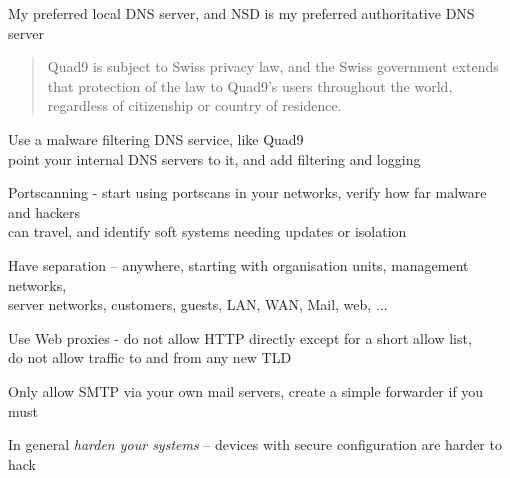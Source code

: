 \documentclass[Screen16to9,17pt]{foils}
\begin{document}

My preferred local DNS server, and NSD is my preferred authoritative DNS server


\begin{quote}
Quad9 is subject to Swiss privacy law, and the Swiss government extends that protection of the law to Quad9's users throughout the world, regardless of citizenship or country of residence.
\end{quote}

\begin{list2}
\item Use a malware filtering DNS service, like Quad9  \\
point your internal DNS servers to it, and add filtering and logging
\item Portscanning - start using portscans in your networks, verify how far malware and hackers\\
 can travel, and identify soft systems needing updates or isolation
\item Have separation -- anywhere, starting with organisation units, management networks,\\
server networks, customers, guests, LAN, WAN, Mail, web, ...
\item Use Web proxies - do not allow HTTP directly except for a short allow list, \\
do not allow traffic to and from any new TLD
\item Only allow SMTP via your own mail servers, create a simple forwarder if you must
\item In general \emph{harden your systems} -- devices with secure configuration are harder to hack
\end{list2}

\end{document}
